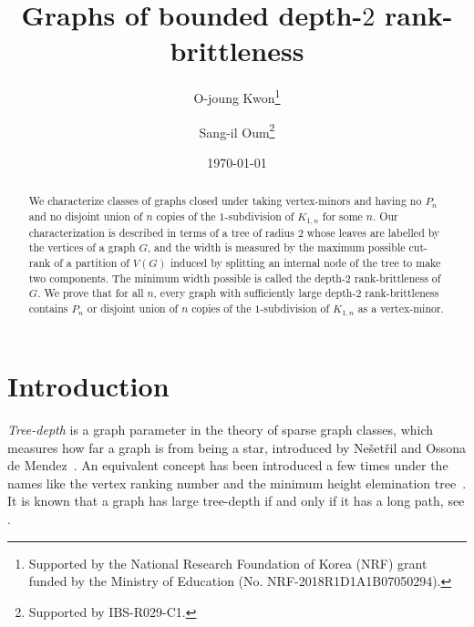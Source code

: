 \documentclass[11pt]{article}
\begin{document}
\title{Graphs of bounded depth-$2$ rank-brittleness}

\author[1,2]{O-joung Kwon\thanks{Supported by the National Research Foundation of Korea (NRF) grant funded by the Ministry of Education (No. NRF-2018R1D1A1B07050294).}}
\author[2,3]{Sang-il Oum\thanks{Supported by IBS-R029-C1.}}
\date\today
\maketitle


\begin{abstract}
  We characterize classes of graphs
  closed under taking vertex-minors and 
  having no $P_n$ and no disjoint union of $n$ copies of the $1$-subdivision of $K_{1,n}$ for some $n$.
  Our characterization is described in terms of a tree of radius $2$ whose leaves are labelled by the vertices of  a graph $G$,
  and the width is measured by the maximum possible cut-rank of a partition of $V(G)$ induced by splitting an internal node of the tree to make two components. The minimum width possible is called the depth-$2$ rank-brittleness of $G$.
  We prove that
  for all $n$, every graph with sufficiently large depth-$2$ rank-brittleness
  contains $P_n$ or disjoint union of $n$ copies of the $1$-subdivision of $K_{1,n}$
  as a vertex-minor.
\end{abstract}

\section{Introduction}

\emph{Tree-depth} is a graph parameter in the theory of sparse graph classes, which measures how far a graph is from being a star, introduced by Ne{\v{s}}et{\v{r}}il and Ossona de Mendez~\cite{nevsetvril2006tree}. An equivalent concept has been introduced a few times under the names like the vertex ranking number and the minimum height elemination tree~\cite{bodlaender1998rankings,deogun1994vertex,schaffer1989optimal}. 
It is known that a graph has large tree-depth if and only if it has a long path, see \cite[Section 6.2]{NO2012}.
%
%
\end{document}
